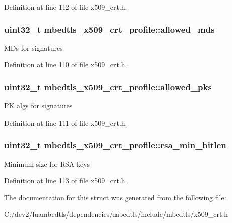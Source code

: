Definition at line 112 of file x509\-\_\-crt.\-h.

\hypertarget{structmbedtls__x509__crt__profile_a1251640211d47c8e4b80b99d5b178685}{
\subsubsection[{allowed\-\_\-mds}]{\setlength{\rightskip}{0pt plus 5cm}uint32\-\_\-t mbedtls\-\_\-x509\-\_\-crt\-\_\-profile\-::allowed\-\_\-mds}}\label{structmbedtls__x509__crt__profile_a1251640211d47c8e4b80b99d5b178685}
M\-Ds for signatures 

Definition at line 110 of file x509\-\_\-crt.\-h.

\hypertarget{structmbedtls__x509__crt__profile_a13cba76eca3f0bce8a93b8f59fe69370}{
\subsubsection[{allowed\-\_\-pks}]{\setlength{\rightskip}{0pt plus 5cm}uint32\-\_\-t mbedtls\-\_\-x509\-\_\-crt\-\_\-profile\-::allowed\-\_\-pks}}\label{structmbedtls__x509__crt__profile_a13cba76eca3f0bce8a93b8f59fe69370}
P\-K algs for signatures 

Definition at line 111 of file x509\-\_\-crt.\-h.

\hypertarget{structmbedtls__x509__crt__profile_a094e9eb35ed5e9a16b67d2e8bd97e83c}{
\subsubsection[{rsa\-\_\-min\-\_\-bitlen}]{\setlength{\rightskip}{0pt plus 5cm}uint32\-\_\-t mbedtls\-\_\-x509\-\_\-crt\-\_\-profile\-::rsa\-\_\-min\-\_\-bitlen}}\label{structmbedtls__x509__crt__profile_a094e9eb35ed5e9a16b67d2e8bd97e83c}
Minimum size for R\-S\-A keys 

Definition at line 113 of file x509\-\_\-crt.\-h.



The documentation for this struct was generated from the following file\-:\begin{DoxyCompactItemize}
\item 
C\-:/dev2/luambedtls/dependencies/mbedtls/include/mbedtls/x509\-\_\-crt.\-h\end{DoxyCompactItemize}
